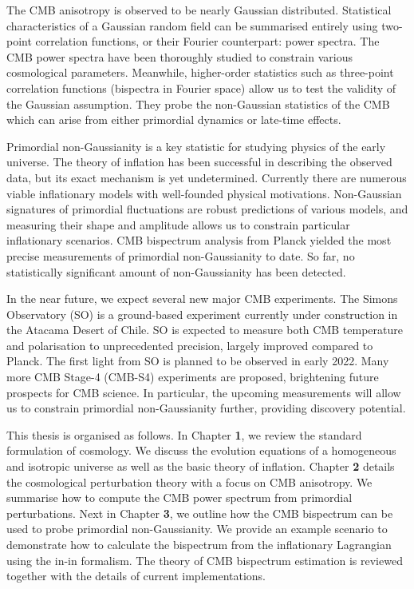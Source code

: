 The CMB anisotropy is observed to be nearly Gaussian distributed. Statistical characteristics of a Gaussian random field can be summarised entirely using two-point correlation functions, or their Fourier counterpart: power spectra. The CMB power spectra have been thoroughly studied to constrain various cosmological parameters. Meanwhile, higher-order statistics such as three-point correlation functions (bispectra in Fourier space) allow us to test the validity of the Gaussian assumption. They probe the non-Gaussian statistics of the CMB which can arise from either primordial dynamics or late-time effects.

Primordial non-Gaussianity is a key statistic for studying physics of the early universe. The theory of inflation has been successful in describing the observed data, but its exact mechanism is yet undetermined. Currently there are numerous viable inflationary models with well-founded physical motivations. Non-Gaussian signatures of primordial fluctuations are robust predictions of various models, and measuring their shape and amplitude allows us to constrain particular inflationary scenarios. CMB bispectrum analysis from Planck yielded the most precise measurements of primordial non-Gaussianity to date. So far, no statistically significant amount of non-Gaussianity has been detected.

In the near future, we expect several new major CMB experiments. The Simons Observatory (SO) \cite{TheSimonsObservatoryCollaboration2018} is a ground-based experiment currently under construction in the Atacama Desert of Chile. SO is expected to measure both CMB temperature and polarisation to unprecedented precision, largely improved compared to Planck. The first light from SO is planned to be observed in early 2022. Many more CMB Stage-4 (CMB-S4) experiments are proposed, brightening future prospects for CMB science. In particular, the upcoming measurements will allow us to constrain primordial non-Gaussianity further, providing discovery potential.

\hspace{10pt}

This thesis is organised as follows. In Chapter \textbf{1}, we review the standard formulation of cosmology. We discuss the evolution equations of a homogeneous and isotropic universe as well as the basic theory of inflation. Chapter \textbf{2} details the cosmological perturbation theory with a focus on CMB anisotropy. We summarise how to compute the CMB power spectrum from primordial perturbations. Next in Chapter \textbf{3}, we outline how the CMB bispectrum can be used to probe primordial non-Gaussianity. We provide an example scenario to demonstrate how to calculate the bispectrum from the inflationary Lagrangian using the in-in formalism. The theory of CMB bispectrum estimation is reviewed together with the details of current implementations.

